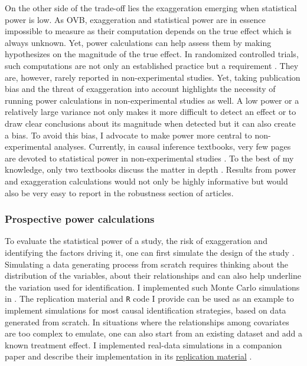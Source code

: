\documentclass[usletter, 12pt]{article}
\begin{document}
			On the other side of the trade-off lies the exaggeration emerging when statistical power is low. As OVB, exaggeration and statistical power are in essence impossible to measure as their computation depends on the true effect which is always unknown. Yet, power calculations can help assess them by making hypothesizes on the magnitude of the true effect. In randomized controlled trials, such computations are not only an established practice but a requirement \citep{duflo_using_2007, mcconnellGoingSimpleSample2015, athey_econometrics_2016}. They are, however, rarely reported in non-experimental studies. %
			Yet, taking publication bias and the threat of exaggeration into account highlights the necessity of running power calculations in non-experimental studies as well. A low power or a relatively large variance not only makes it more difficult to detect an effect or to draw clear conclusions about its magnitude when detected but it can also create a bias. To avoid this bias, I advocate to make power more central to non-experimental analyses. Currently, in causal inference textbooks, very few pages are devoted to statistical power in non-experimental studies \citep{angrist_mostly_2009, angrist_mastering_2014, imbens_causal_2015, cunningham_causal_2021}. To the best of my knowledge, only two textbooks discuss the matter in depth \citep{shadish_experimental_2002, huntington-klein_effect_2021}. Results from power and exaggeration calculations would not only be highly informative but would also be very easy to report in the robustness section of articles. 
			
			\subsubsection{Prospective power calculations}
						
				To evaluate the statistical power of a study, the risk of exaggeration and identifying the factors driving it, one can first simulate the design of the study \citep{hill_bayesian_2011, gelman_regression_2020, black_simulated_2022}. %
				Simulating a data generating process from scratch requires thinking about the distribution of the variables, about their relationships and can also help underline the variation used for identification. %
			 I implemented such Monte Carlo simulations in . The replication material and \verb?R? code I provide can be used as an example to implement simulations for most causal identification strategies, based on data generated from scratch. In situations where the relationships among covariates are too complex to emulate, one can also start from an existing dataset and add a known treatment effect. I implemented real-data simulations in a companion paper and describe their implementation in its \href{https://vincentbagilet.github.io/inference_pollution/}{replication material} \citep{bagilet_accurate_2023}. 
			 
\end{document}
